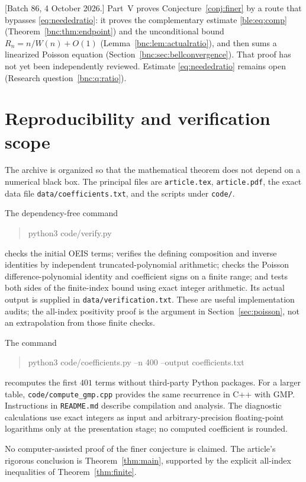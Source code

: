 \documentclass[11pt]{article}
\numberwithin{equation}{section}
\theoremstyle{definition}
\theoremstyle{remark}
\begin{document}
[Batch 86, 4 October 2026.] Part~V proves Conjecture~\ref{conj:finer} by a route that
bypasses \eqref{eq:neededratio}: it proves the complementary estimate
\eqref{ble:eq:comp} (Theorem~\ref{bnc:thm:endpoint}) and the
unconditional bound $R_n=n/W(n)+O(1)$ (Lemma~\ref{bnc:lem:actualratio}),
and then sums a linearized Poisson equation
(Section~\ref{bnc:sec:bellconvergence}). That proof has not yet been
independently reviewed. Estimate \eqref{eq:neededratio} remains open
(Research question~\ref{bnc:q:ratio}).

\section{Reproducibility and verification scope}

The archive is organized so that the mathematical theorem does not
depend on a numerical black box. The principal files are
\texttt{article.tex}, \texttt{article.pdf}, the exact data file
\texttt{data/coefficients.txt}, and the scripts under \texttt{code/}.

The dependency-free command
\begin{quote}\ttfamily
 python3 code/verify.py
\end{quote}
checks the initial OEIS terms; verifies the defining composition and
inverse identities by independent truncated-polynomial arithmetic;
checks the Poisson difference-polynomial identity and coefficient signs
on a finite range; and tests both sides of the finite-index bound using
exact integer arithmetic. Its actual output is supplied in
\texttt{data/verification.txt}. These are useful implementation audits;
the all-index positivity proof is the argument in
Section~\ref{sec:poisson}, not an extrapolation from those finite checks.

The command
\begin{quote}\ttfamily
 python3 code/coefficients.py --n 400 --output coefficients.txt
\end{quote}
recomputes the first $401$ terms without third-party Python packages.
For a larger table, \texttt{code/compute\_gmp.cpp} provides the same
recurrence in C++ with GMP. Instructions in \texttt{README.md} describe
compilation and analysis. The diagnostic calculations use exact
integers as input and arbitrary-precision floating-point logarithms only
at the presentation stage; no computed coefficient is rounded.

No computer-assisted proof of the finer conjecture is claimed. The
article's rigorous conclusion is Theorem~\ref{thm:main}, supported by
the explicit all-index inequalities of Theorem~\ref{thm:finite}.
\end{document}
